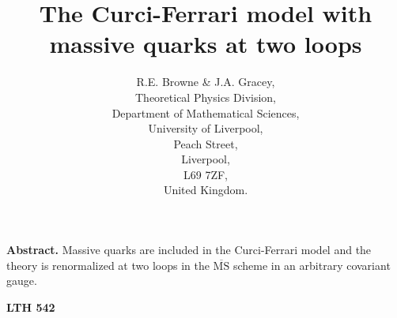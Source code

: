 \documentclass[a4paper,11pt]{article}
\newcommand{\MSbar}{\overline{\mbox{MS}}}
\begin{document}
\title{The Curci-Ferrari model with massive quarks at two loops} 
\author{R.E. Browne \& J.A. Gracey, \\ Theoretical Physics Division, \\ 
Department of Mathematical Sciences, \\ University of Liverpool, \\ Peach 
Street, \\ Liverpool, \\ L69 7ZF, \\ United Kingdom.} 
\date{} 
\maketitle 
\vspace{5cm} 
\noindent 
{\bf Abstract.} Massive quarks are included in the Curci-Ferrari model and the
theory is renormalized at two loops in the $\MSbar$ scheme in an arbitrary
covariant gauge.  

\vspace{-14cm} 
\hspace{13.5cm} 
{\bf LTH 542} 

\newpage 
\end{document}
